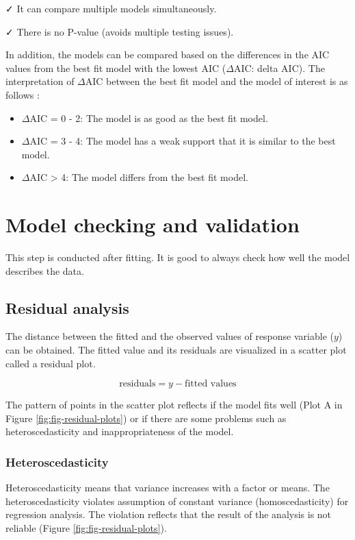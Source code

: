 \documentclass[
]{book}
\providecommand{\tightlist}{%
  \setlength{\itemsep}{0pt}\setlength{\parskip}{0pt}}
\begin{document}
✓ It can compare multiple models simultaneously.

✓ There is no P-value (avoids multiple testing issues).

In addition, the models can be compared based on the differences in the AIC values from the best fit model with the lowest AIC (\(\Delta\)AIC: delta AIC). The interpretation of \(\Delta\)AIC between the best fit model and the model of interest is as follows \citep{greenwood2022}:

\begin{itemize}
\tightlist
\item
  \(\Delta\)AIC = 0 - 2: The model is as good as the best fit model.
\item
  \(\Delta\)AIC = 3 - 4: The model has a weak support that it is similar to the best model.
\item
  \(\Delta\)AIC \textgreater{} 4: The model differs from the best fit model.
\end{itemize}

\section{Model checking and validation}\label{model-checking-and-validation}

This step is conducted after fitting. It is good to always check how well the model describes the data.

\subsection{Residual analysis}\label{residual-analysis}

The distance between the fitted and the observed values of response variable (\(y\)) can be obtained. The fitted value and its residuals are visualized in a scatter plot called a residual plot.

\[\text{residuals} = y - \text{fitted values}\]

The pattern of points in the scatter plot reflects if the model fits well (Plot A in Figure \ref{fig:fig-residual-plots}) or if there are some problems such as heteroscedasticity and inappropriateness of the model.

\subsubsection{Heteroscedasticity}\label{heteroscedasticity}

Heteroscedasticity means that variance increases with a factor or means. The heteroscedasticity violates assumption of constant variance (homoscedasticity) for regression analysis. The violation reflects that the result of the analysis is not reliable (Figure \ref{fig:fig-residual-plots}).
\end{document}
